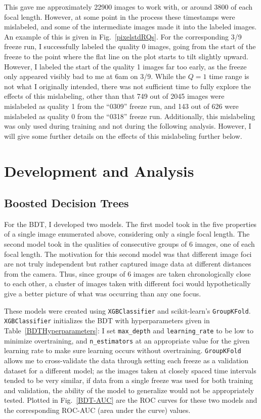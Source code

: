 \documentclass{article}
\begin{document}
This gave me approximately 22900 images to work with, or around 3800 of each focal length. However, at some point in the process these timestamps were mislabeled, and some of the intermediate images made it into the labeled images. An example of this is given in Fig.~\ref{pixelstdRQs}. For the corresponding 3/9 freeze run, I successfully labeled the quality 0 images, going from the start of the freeze to the point where the flat line on the plot starts to tilt slightly upward. However, I labeled the start of the quality 1 images far too early, as the freeze only appeared visibly bad to me at 6am on 3/9. While the $Q=1$ time range is not what I originally intended, there was not sufficient time to fully explore the effects of this mislabeling, other than that 749 out of 2045 images were mislabeled as quality 1 from the ``0309'' freeze run, and 143 out of 626 were mislabeled as quality 0 from the ``0318'' freeze run. Additionally, this mislabeling was only used during training and not during the following analysis. However, I will give some further details on the effects of this mislabeling further below.

\section*{Development and Analysis}

\subsection*{Boosted Decision Trees}

For the BDT, I developed two models. The first model took in the five properties of a single image enumerated above, considering only a single focal length. The second model took in the qualities of consecutive groups of 6 images, one of each focal length. The motivation for this second model was that different image foci are not truly independent but rather captured image data at different distances from the camera. Thus, since groups of 6 images are taken chronologically close to each other, a cluster of images taken with different foci would hypothetically give a better picture of what was occurring than any one focus.

These models were created using \verb|XGBClassifier| and scikit-learn's \verb|GroupKFold|. \verb|XGBClassifier| initializes the BDT with hyperparameters given in Table~\ref{BDTHyperparameters}: I set \verb|max_depth| and \verb|learning_rate| to be low to minimize overtraining, and \verb|n_estimators| at an appropriate value for the given learning rate to make sure learning occurs without overtraining. \verb|GroupKFold| allows me to cross-validate the data through setting each freeze as a validation dataset for a different model; as the images taken at closely spaced time intervals tended to be very similar, if data from a single freeze was used for both training and validation, the ability of the model to generalize would not be appropriately tested. Plotted in Fig.~\ref{BDT-AUC} are the ROC curves for these two models and the corresponding ROC-AUC (area under the curve) values.
\end{document}
